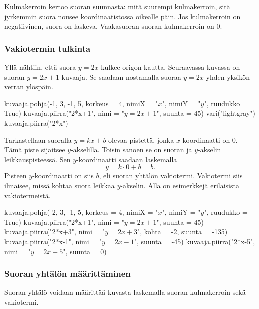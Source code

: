 Kulmakerroin kertoo suoran suunnasta: mitä suurempi kulmakerroin, sitä jyrkemmin suora nousee koordinaatistossa oikealle päin.
Jos kulmakerroin on negatiivinen, suora on laskeva. Vaakasuoran suoran kulmakerroin on 0.

\subsubsection*{Vakiotermin tulkinta}

Yllä nähtiin, että suora $y=2x$ kulkee origon kautta. Seuraavassa kuvassa on suoran $y=2x+1$ kuvaaja. Se saadaan nostamalla suoraa $y=2x$ yhden yksikön verran ylöspäin.

\begin{kuva}
    kuvaaja.pohja(-1, 3, -1, 5, korkeus = 4, nimiX = "$x$", nimiY = "$y$", ruudukko = True)
    kuvaaja.piirra("2*x+1", nimi = "$y=2x+1$", suunta = 45)
    vari("lightgray")
    kuvaaja.piirra("2*x")
\end{kuva}

Tarkastellaan suoralla $y=kx+b$ olevaa pistettä, jonka $x$-koordinaatti on 0.
Tämä piste sijaitsee $y$-akselilla. Toisin sanoen se on suoran ja $y$-akselin leikkauspisteessä.
Sen $y$-koordinaatti saadaan laskemalla
\[
y=k\cdot 0+b=b.
\]
Pisteen $y$-koordinaatti on siis $b$, eli suoran yhtälön vakiotermi. Vakiotermi siis ilmaisee, missä kohtaa suora leikkaa $y$-akselin.
Alla on esimerkkejä erilaisista vakiotermeistä.


\begin{kuva}
    kuvaaja.pohja(-2, 3, -1, 5, korkeus = 4, nimiX = "$x$", nimiY = "$y$", ruudukko = True)
    kuvaaja.piirra("2*x+1", nimi = "$y=2x+1$", suunta = 45)
    kuvaaja.piirra("2*x+3", nimi = "$y=2x+3$", kohta = -2, suunta = -135)
    kuvaaja.piirra("2*x-1", nimi = "$y=2x-1$", suunta = -45)
    kuvaaja.piirra("2*x-5", nimi = "$y=2x-5$", suunta = 0)
\end{kuva}

\subsubsection*{Suoran yhtälön määrittäminen}

Suoran yhtälö voidaan määrittää kuvasta laskemalla suoran kulmakerroin sekä vakiotermi.

